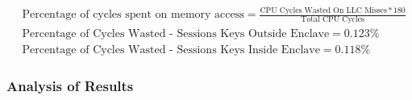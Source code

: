 \documentclass[../../../main.tex]{subfiles}
\begin{document}
\begin{align*}
  &\text{Percentage of cycles spent on memory access} =
  \frac{\text{CPU Cycles Wasted On LLC Misses} * 180}{\text{Total CPU
  Cycles}} \\
  &\text{Percentage of Cycles Wasted - Sessions Keys Outside Enclave} = 0.123\% \\
  &\text{Percentage of Cycles Wasted - Sessions Keys Inside Enclave} = 0.118\%        
\end{align*}

\subsubsection*{Analysis of Results}
\end{document}

